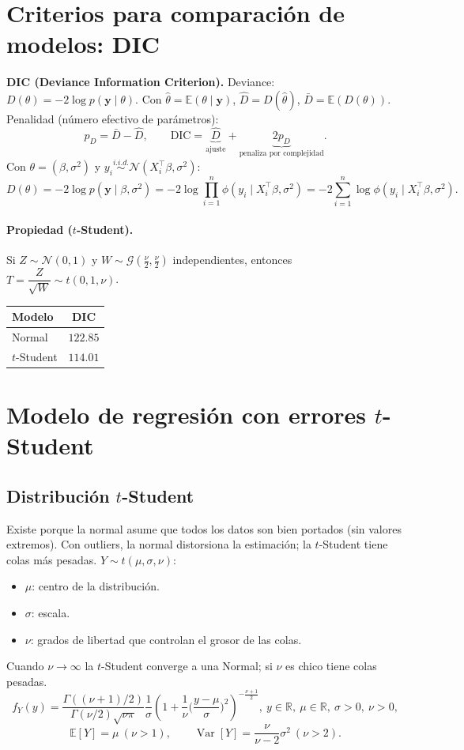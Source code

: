 \documentclass[11pt]{article}
\newcommand{\N}{\mathcal{N}}
\newcommand{\Ga}{\mathcal{G}}
\newcommand{\R}{\mathbb{R}}
\newcommand{\E}{\mathbb{E}}
\newcommand{\Var}{\operatorname{Var}}
\newcommand{\by}{\mathbf{y}}
\theoremstyle{definition}
\begin{document}
\section{Criterios para comparación de modelos: DIC}
\textbf{DIC (Deviance Information Criterion).} Deviance: $D(\theta)=-2\log p(\by\mid\theta)$. Con $\hat\theta=\E(\theta\mid\by)$, $\hat D=D(\hat\theta)$, $\bar D=\E(D(\theta))$. Penalidad (número efectivo de parámetros):
\[
p_D=\bar D-\hat D,\qquad
\text{DIC}=\underbrace{\hat D}_{\text{ajuste}}+\underbrace{2p_D}_{\text{penaliza por complejidad}}.
\]
Con $\theta=(\beta,\sigma^2)$ y $y_i\overset{i.i.d.}{\sim}\N(X_i^{\top}\beta,\sigma^2)$:
\[
D(\theta)=-2\log p(\by\mid\beta,\sigma^2)=-2\log\prod_{i=1}^n\phi(y_i\mid X_i^{\top}\beta,\sigma^2)=-2\sum_{i=1}^n\log\phi(y_i\mid X_i^{\top}\beta,\sigma^2).
\]

\paragraph{Propiedad ($t$-Student).} Si $Z\sim\N(0,1)$ y $W\sim\Ga(\tfrac{\nu}{2},\tfrac{\nu}{2})$ independientes, entonces $T=\dfrac{Z}{\sqrt{W}}\sim t(0,1,\nu)$.

\begin{center}
\begin{tabular}{lc}
\hline
Modelo & DIC \\ \hline
Normal & $122.85$ \\
$t$-Student & $114.01$ \\ \hline
\end{tabular}
\end{center}

\section{Modelo de regresión con errores $t$-Student}
\subsection{Distribución $t$-Student}
Existe porque la normal asume que todos los datos son bien portados (sin valores extremos). Con outliers, la normal distorsiona la estimación; la $t$-Student tiene colas más pesadas. $Y\sim t(\mu,\sigma,\nu)$:
\begin{itemize}[leftmargin=2em]
  \item $\mu$: centro de la distribución.
  \item $\sigma$: escala.
  \item $\nu$: grados de libertad que controlan el grosor de las colas.
\end{itemize}
Cuando $\nu\to\infty$ la $t$-Student converge a una Normal; si $\nu$ es chico tiene colas pesadas.
\[
f_Y(y)=\frac{\Gamma((\nu+1)/2)}{\Gamma(\nu/2)\sqrt{\nu\pi}}\frac{1}{\sigma}\left(1+\frac{1}{\nu}\Big(\frac{y-\mu}{\sigma}\Big)^2\right)^{-\frac{\nu+1}{2}},\ y\in\R,\ \mu\in\R,\ \sigma>0,\ \nu>0,
\]
\[
\E[Y]=\mu\ (\nu>1),\qquad \Var[Y]=\frac{\nu}{\nu-2}\sigma^2\ (\nu>2).
\]
\end{document}
